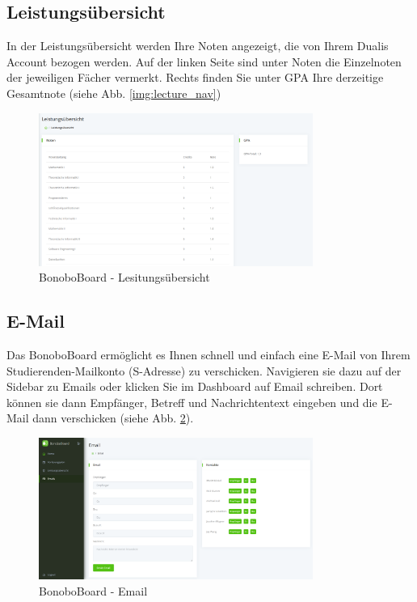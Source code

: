 \documentclass[a4paper,11pt]{scrartcl}
\begin{document}
\subsection{Leistungsübersicht}
In der Leistungsübersicht werden Ihre Noten angezeigt, die von Ihrem Dualis Account bezogen werden. Auf der linken Seite sind unter \frqq{}Noten\flqq{} die Einzelnoten der jeweiligen Fächer vermerkt. Rechts finden Sie unter \frqq{}GPA\flqq{} Ihre derzeitige Gesamtnote (siehe Abb. \ref{img:lecture_nav})

\begin{figure}[H]
	\begin{center}
		\includegraphics[width=0.8\textwidth]{dualis}
		\caption{BonoboBoard - Lesitungsübersicht}
		\label{img:dualis}
	\end{center}
\end{figure}
\noindent

\subsection{E-Mail}
\label{sec:email}
Das BonoboBoard ermöglicht es Ihnen schnell und einfach eine E-Mail von Ihrem Studierenden-Mailkonto (\frqq{}S-Adresse\flqq{}) zu verschicken. Navigieren sie dazu auf der Sidebar zu \frqq{}Emails\flqq{} oder klicken Sie im Dashboard auf \frqq{}Email schreiben\flqq{}. Dort können sie dann Empfänger, Betreff und Nachrichtentext eingeben und die E-Mail dann verschicken (siehe Abb. \ref{img:mail}).
 
\begin{figure}[H]
	\begin{center}
		\includegraphics[width=0.8\textwidth]{Mail}
		\caption{BonoboBoard - Email}
		\label{img:mail}
	\end{center}
\end{figure}
\end{document}
